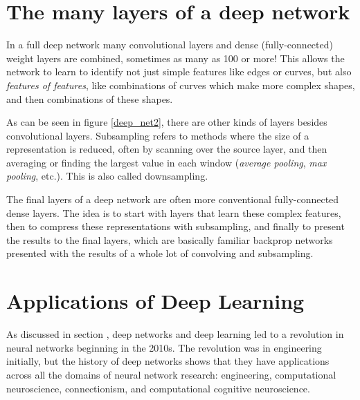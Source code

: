 \section{The many layers of a deep network}

In a full deep network many convolutional layers and dense (fully-connected) weight layers are combined, sometimes as many as 100 or more! This allows the network to learn to identify not just simple features like edges or curves, but also \emph{features of features}, like combinations of curves which make more complex shapes, and then combinations of these shapes. 

As can be seen in figure \ref{deep_net2}, there are other kinds of layers besides convolutional layers. Subsampling refers to methods where the size of a representation is reduced, often by scanning over the source layer, and then averaging or finding the largest value in each window (\emph{average pooling}, \emph{max pooling}, etc.).  This is also called downsampling.  

The final layers of a deep network are often more conventional fully-connected dense layers. The idea is to start with layers that learn these complex features, then to compress these representations with subsampling, and finally to present the results to the final layers, which are basically familiar backprop networks presented with the results of a whole lot of convolving and subsampling.

\section{Applications of Deep Learning}

 
As discussed in section , deep networks and deep learning led to a revolution in neural networks beginning in the 2010s. The revolution was in engineering initially, but the history of deep networks shows that they have applications across all the domains of neural network research: engineering, computational neuroscience, connectionism, and computational cognitive neuroscience. 

